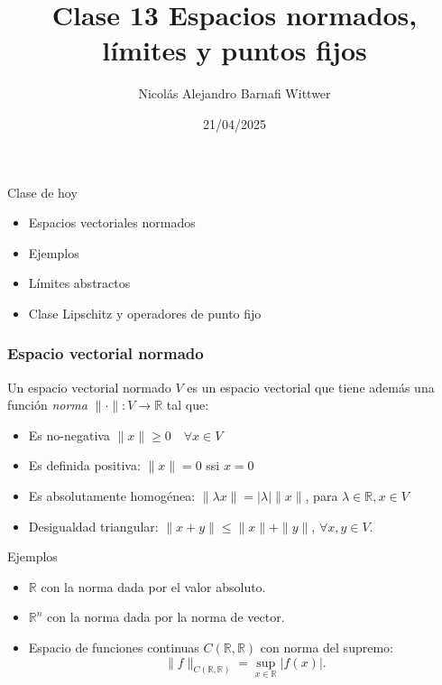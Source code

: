 \documentclass[12pt,aspectratio=169,xcolor=dvipsnames]{beamer}
\title[short title]{Clase 13 Espacios normados, límites y puntos fijos}
\subtitle{}
\author[NA Barnafi] {Nicolás Alejandro Barnafi Wittwer}
\institute[UC|CMM] 
{
    Pontificia Universidad Católica de Chile \\
    Centro de Modelamiento Matemático
}
\date{21/04/2025}
\newcommand{\R}{\mathbb{R}}
\begin{document}
\begin{frame}
    \maketitle
\end{frame}
\begin{frame}{Clase de hoy}
    \begin{itemize}
        \item Espacios vectoriales normados
        \item Ejemplos
        \item Límites abstractos
        \item Clase Lipschitz y operadores de punto fijo
    \end{itemize}

    \vspace{1cm}
\end{frame}
\begin{frame}\frametitle{Espacio vectorial normado}
    Un espacio vectorial normado $V$ es un espacio vectorial que tiene además una función \emph{norma} $\|\cdot\|:V \to \R$ tal que: 
    \begin{itemize}
        \item Es no-negativa $\|x\|\geq 0\quad\forall x \in V$
        \item Es definida positiva: $\|x\|=0$ ssi $x=0$ 
        \item Es absolutamente homogénea: $\|\lambda x\| = |\lambda| \|x\|$, para $\lambda \in \R, x\in V$
        \item Desigualdad triangular: $\|x+y\| \leq \|x\| + \|y \|$, $\forall x,y \in V$. 
    \end{itemize}

\end{frame}
\begin{frame}{Ejemplos}
    \begin{itemize}
        \item $\R$ con la norma dada por el valor absoluto.
        \item $\R^n$ con la norma dada por la norma de vector.
        \item Espacio de funciones continuas $C(\R,\R)$ con norma del supremo: 
            $$ \| f \|_{C(\R,\R)} = \sup_{x\in \R}|f(x)|. $$
    \end{itemize}
\end{frame}
\end{document}
